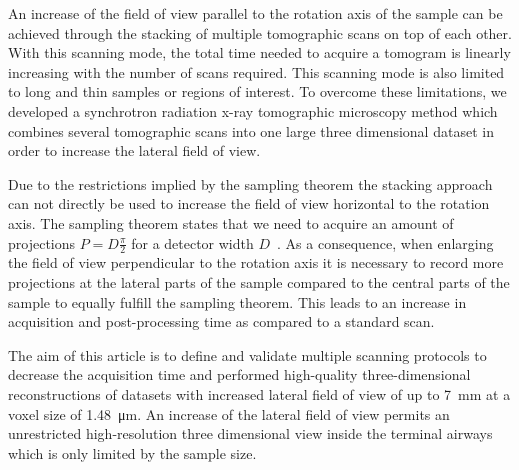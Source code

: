 An increase of the field of view parallel to the rotation axis of the sample can be achieved through the stacking of multiple tomographic scans on top of each other. With this scanning mode, the total time needed to acquire a tomogram is linearly increasing with the number of scans required. This scanning mode is also limited to long and thin samples or regions of interest. 
To overcome these limitations, we developed a synchrotron radiation x-ray tomographic microscopy method which combines several tomographic scans into one large three dimensional dataset in order to increase the lateral field of view.

Due to the restrictions implied by the sampling theorem the stacking approach can not directly be used to increase the field of view horizontal to the rotation axis. The sampling theorem states that we need to acquire an amount of projections $P=D\frac{\pi}{2}$ for a detector width $D$~\cite[page 186]{Kak2002}. As a consequence, when enlarging the field of view perpendicular to the rotation axis it is necessary to record more projections at the lateral parts of the sample compared to the central parts of the sample to equally fulfill the sampling theorem. This leads to an increase in acquisition and post-processing time as compared to a standard scan.

The aim of this article is to define and validate multiple scanning protocols to decrease the acquisition time and performed high-quality three-dimensional reconstructions of datasets with increased lateral field of view of up to \SI{7}{\milli\meter} at a voxel size of \SI{1.48}{\micro\meter}. An increase of the lateral field of view permits an unrestricted high-resolution three dimensional view inside the terminal airways which is only limited by the sample size.